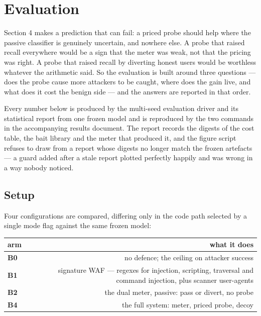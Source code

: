 
\section{Evaluation}

Section 4 makes a prediction that can fail: a priced probe should help where the
passive classifier is genuinely uncertain, and nowhere else. A probe that raised
recall everywhere would be a sign that the meter was weak, not that the pricing was
right. A probe that raised recall by diverting honest users would be worthless
whatever the arithmetic said. So the evaluation is built around three questions ---
does the probe cause more attackers to be caught, where does the gain live, and
what does it cost the benign side --- and the answers are reported in that order.

Every number below is produced by the multi-seed evaluation driver and its statistical report from one frozen model and is reproduced by the two commands
in the accompanying results document. The report records the digests of the cost table, the bait
library and the meter that produced it, and the figure script refuses to draw from
a report whose digests no longer match the frozen artefacts --- a guard added after a
stale report plotted perfectly happily and was wrong in a way nobody noticed.


\subsection{Setup}

Four configurations are compared, differing only in the code path selected by a
single mode flag against the same frozen model:

\begin{table}[t]
\centering
\small
\begin{tabular}{lr}
\toprule
arm & what it does \\
\midrule
\textbf{B0} & no defence; the ceiling on attacker success \\
\textbf{B1} & signature WAF --- regexes for injection, scripting, traversal and command injection, plus scanner user-agents \\
\textbf{B2} & the dual meter, passive: pass or divert, no probe \\
\textbf{B4} & the full system: meter, priced probe, decoy \\
\bottomrule
\end{tabular}
\end{table}


